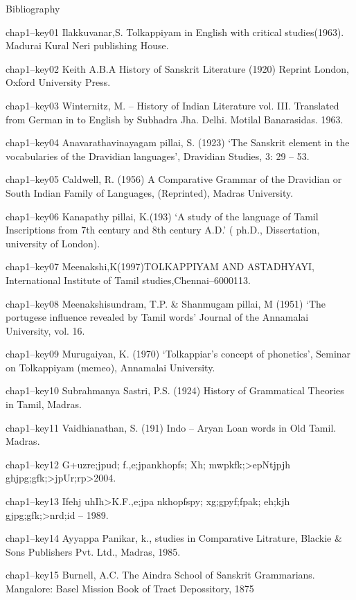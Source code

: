 Bibliography

chap1–key01 Ilakkuvanar,S. Tolkappiyam in English with critical studies(1963). Madurai Kural Neri publishing House.

 chap1–key02 Keith A.B.A History of Sanskrit Literature (1920) Reprint London, Oxford University Press. 

 chap1–key03 Winternitz, M. – History of Indian Literature vol. III. Translated from German in to English by Subhadra Jha. Delhi. Motilal Banarasidas. 1963.

 chap1–key04 Anavarathavinayagam pillai, S. (1923) ‘The Sanskrit element in the vocabularies of the Dravidian languages’, Dravidian Studies, 3: 29 – 53.

 chap1–key05 Caldwell, R. (1956) A Comparative Grammar of the Dravidian or South Indian Family of Languages, (Reprinted), Madras University.

 chap1–key06 Kanapathy pillai, K.(193) ‘A study of the language of Tamil Inscriptions from 7th century and 8th century A.D.’ ( ph.D., Dissertation, university of London).

 chap1–key07 Meenakshi,K(1997)TOLKAPPIYAM AND ASTADHYAYI, International Institute of Tamil studies,Chennai–6000113.

 chap1–key08 Meenakshisundram, T.P. \& Shanmugam pillai, M (1951) ‘The portugese influence revealed by Tamil words’ Journal of the Annamalai University, vol. 16.

 chap1–key09 Murugaiyan, K. (1970) ‘Tolkappiar’s concept of phonetics’, Seminar on Tolkappiyam (memeo), Annamalai University.

 chap1–key10 Subrahmanya Sastri, P.S. (1924) History of Grammatical Theories in Tamil, Madras.

 chap1–key11 Vaidhianathan, S. (191) Indo – Aryan Loan words in Old Tamil. Madras.

 chap1–key12 G+uzre;jpud; f.,e;jpankhopfs; Xh; mwpkfk;\textgreater  epNtjpjh ghjpg;gfk;\textgreater  jpUr;rp\textgreater  2004.

 chap1–key13 Ifehj uhIh\textgreater  K.F.,e;jpa nkhopfspy; xg;gpyf;fpak; eh;kjh gjpg;gfk;\textgreater  nrd;id – 1989.

 chap1–key14 Ayyappa Panikar, k., studies in Comparative Litrature, Blackie \& Sons Publishers Pvt. Ltd., Madras, 1985.

 chap1–key15 Burnell, A.C. The Aindra School of Sanskrit Grammarians. Mangalore: Basel Mission Book of Tract Depossitory, 1875


